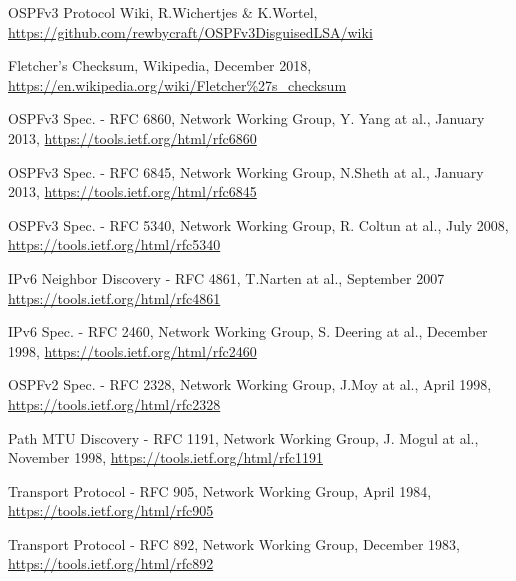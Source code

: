 \documentclass[11pt,a4paper,oneside]{article}
\begin{document}
    \begin{thebibliography}{999}

        OSPFv3 Protocol Wiki,
        R.Wichertjes \& K.Wortel,
        \url{https://github.com/rewbycraft/OSPFv3DisguisedLSA/wiki}

        Fletcher's Checksum,
        Wikipedia,
        December 2018,
        \url{https://en.wikipedia.org/wiki/Fletcher\%27s_checksum}


        OSPFv3 Spec. - RFC 6860,
        Network Working Group,
        Y. Yang at al.,
        January 2013,
        \url{https://tools.ietf.org/html/rfc6860}

        OSPFv3 Spec. - RFC 6845,
        Network Working Group,
        N.Sheth at al.,
        January 2013,
        \url{https://tools.ietf.org/html/rfc6845}

        OSPFv3 Spec. - RFC 5340,
        Network Working Group,
        R. Coltun at al.,
        July 2008,
        \url{https://tools.ietf.org/html/rfc5340}

        IPv6 Neighbor Discovery - RFC 4861,
        T.Narten at al.,
        September 2007
        \url{https://tools.ietf.org/html/rfc4861}

        IPv6 Spec. - RFC 2460,
        Network Working Group,
        S. Deering at al.,
        December 1998,
        \url{https://tools.ietf.org/html/rfc2460}

        OSPFv2 Spec. - RFC 2328,
        Network Working Group,
        J.Moy at al.,
        April 1998,
        \url{https://tools.ietf.org/html/rfc2328}

        Path MTU Discovery - RFC 1191,
        Network Working Group,
        J. Mogul at al.,
        November 1998,
        \url{https://tools.ietf.org/html/rfc1191}

        Transport Protocol - RFC 905,
        Network Working Group,
        April 1984,
        \url{https://tools.ietf.org/html/rfc905}

        Transport Protocol - RFC 892,
        Network Working Group,
        December 1983,
        \url{https://tools.ietf.org/html/rfc892}

    \end{thebibliography}
\end{document}
